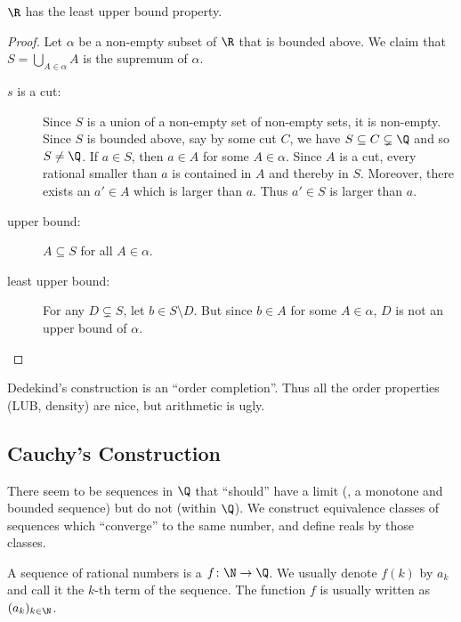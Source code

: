 \begin{theorem*}
    $\R$ has the least upper bound property.
\end{theorem*}
\begin{proof}
    Let $\alpha$ be a non-empty subset of $\R$ that is bounded above.
    We claim that $S = \bigcup_{A \in \alpha} A$ is the supremum of $\alpha$.
    \begin{description}
        \item[$s$ is a cut:] Since $S$ is a union of a non-empty set of
        non-empty sets, it is non-empty.
        Since $S$ is bounded above, say by some cut $C$, we have
        $S \subseteq C \subsetneq \Q$ and so $S \ne \Q$.
        If $a \in S$, then $a \in A$ for some
        $A \in \alpha$. Since $A$ is a cut, every rational smaller than $a$
        is contained in $A$ and thereby in $S$.
        Moreover, there exists an $a' \in A$ which is larger than $a$.
        Thus $a' \in S$ is larger than $a$.
        \item[upper bound:] $A \subseteq S$ for all $A \in \alpha$.
        \item[least upper bound:] For any $D \subsetneq S$,
        let $b \in S \setminus D$.
        But since $b \in A$ for some $A \in \alpha$, $D$ is not an upper
        bound of $\alpha$. \qedhere
    \end{description}
\end{proof}
Dedekind's construction is an ``order completion''.
Thus all the order properties (LUB, density) are nice, but arithmetic is
ugly.

\subsection{Cauchy's Construction} \label{sec:R:cauchy}
There seem to be sequences in $\Q$ that ``should'' have a limit (\eg, a
monotone and bounded sequence) but do not (within $\Q$).
We construct equivalence classes of sequences which ``converge'' to the same
number, and define reals by those classes.
\begin{definition}[Sequence]
    A sequence of rational numbers is a $f \colon \N \to \Q$.
    We usually denote $f(k)$ by $a_k$ and call it the $k$-th term of the
    sequence.
    The function $f$ is usually written as $(a_k)_{k \in \N}$.
\end{definition}

